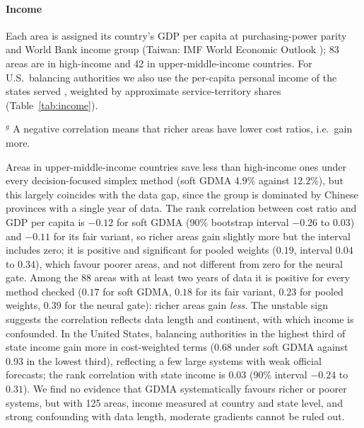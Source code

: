 \paragraph{Income}
Each area is assigned its country's GDP per capita at purchasing-power parity and World Bank income group \citep{WorldBankWDI} (Taiwan: IMF World Economic Outlook \citep{IMFWEO}); 83 areas are in high-income and 42 in upper-middle-income countries.
For U.S.\ balancing authorities we also use the per-capita personal income of the states served \citep{BEApcpi}, weighted by approximate service-territory shares (Table~\ref{tab:income}).

\begin{table}[t]
\centering
\caption{Benefits by income ($W=28$): commitment cost relative to the reference forecaster by World Bank income group and, within the United States, for the balancing authorities in the lowest and highest third of state per-capita income; Spearman rank correlations between an area's cost ratio and income. Lower is better: values below 1 mean a lower cost than the benchmark.}\label{tab:income}
\scriptsize
\setlength{\tabcolsep}{3pt}

\par\smallskip\footnotesize $^g$ A negative correlation means that richer areas have lower cost ratios, i.e.\ gain more.
\end{table}

Areas in upper-middle-income countries save less than high-income ones under every decision-focused simplex method (soft GDMA 4.9\% against 12.2\%), but this largely coincides with the data gap, since the group is dominated by Chinese provinces with a single year of data.
The rank correlation between cost ratio and GDP per capita is $-0.12$ for soft GDMA (90\% bootstrap interval $-0.26$ to $0.03$) and $-0.11$ for its fair variant, so richer areas gain slightly more but the interval includes zero; it is positive and significant for pooled weights ($0.19$, interval $0.04$ to $0.34$), which favour poorer areas, and not different from zero for the neural gate.
Among the 88 areas with at least two years of data it is positive for every method checked ($0.17$ for soft GDMA, $0.18$ for its fair variant, $0.23$ for pooled weights, $0.39$ for the neural gate): richer areas gain \emph{less}.
The unstable sign suggests the correlation reflects data length and continent, with which income is confounded.
In the United States, balancing authorities in the highest third of state income gain more in cost-weighted terms (0.68 under soft GDMA against 0.93 in the lowest third), reflecting a few large systems with weak official forecasts; the rank correlation with state income is $0.03$ (90\% interval $-0.24$ to $0.31$).
We find no evidence that GDMA systematically favours richer or poorer systems, but with 125 areas, income measured at country and state level, and strong confounding with data length, moderate gradients cannot be ruled out.

